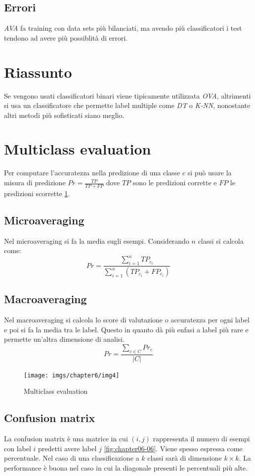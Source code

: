 	\subsection{Errori}
	\emph{AVA} fa training con data sets pi\`u bilanciati, ma avendo pi\`u classificatori i test tendono ad avere pi\`u possiblit\`a di errori.

\section{Riassunto}
Se vengono usati classificatori binari viene tipicamente utilizzata  \emph{OVA}, altrimenti si usa un classificatore che permette label multiple come \emph{DT} o \emph{K-NN}, nonostante altri metodi pi\`u sofisticati siano meglio.

\section{Multiclass evaluation}
Per computare l'accuratezza nella predizione di una classe $c$ si pu\`o usare la misura di predizione $Pr=\frac{TP}{TP+FP}$ dove $TP$ sono le predizioni corrette e $FP$ le predizioni scorrette \ref{fig:chapter06-04}.

	\subsection{Microaveraging}
	Nel microaveraging si fa la media sugli esempi.
	Considerando $n$ classi si calcola come:
	$$Pr=\dfrac{\sum\limits_{i=1}^nTP_{c_i}}{\sum\limits_{i=1}^n(TP_{c_i}+FP_{c_i})}$$
	
	\subsection{Macroaveraging}
	Nel macroaveraging si calcola lo score di valutazione o accuratezza per ogni label e poi si fa la media tra le label.
	Questo in quanto d\`a pi\`u enfasi a label pi\`u rare e permette un'altra dimensione di analisi.
	$$Pr=\dfrac{\sum\limits_{c\in C}Pr_c}{|C|}$$
	
	\begin{figure}
		\centering
		\texttt{[image: imgs/chapter6/img4]}
		\caption{Multiclass evaluation}
		\label{fig:chapter06-04}
	\end{figure}
	
	\subsection{Confusion matrix}
	La confusion matrix \`e una matrice in cui $(i, j)$ rappresenta il numero di esempi con label $i$ predetti avere label $j$ \ref{fig:chapter06-06}.
	Viene spesso espressa come percentuale.
	Nel caso di una classificazione a $k$ classi sar\`a di dimensione $k\times k$.
	La performance \`e buona nel caso in cui la diagonale presenti le percentuali pi\`u alte.
	
